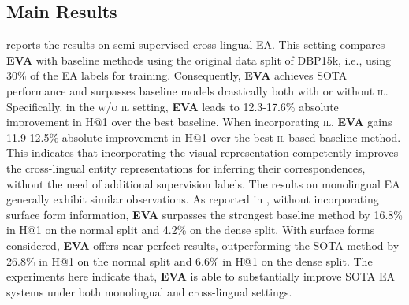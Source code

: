 \documentclass[letterpaper]{article} \usepackage{aaai21}  \usepackage{times}  \usepackage{helvet} \usepackage{courier}  \usepackage[hyphens]{url}  \usepackage{graphicx} \urlstyle{rm} \def\UrlFont{\rm}  \usepackage{natbib}  \usepackage{caption} \frenchspacing  \setlength{\pdfpagewidth}{8.5in}  \setlength{\pdfpageheight}{11in}
\newcommand{\modelname}[0]{\textbf{\textsc{EVA}}\xspace}
\newcommand{\stitle}[1]{\vspace{0.3ex} \noindent{\bf #1}}
\begin{document}
\subsection{Main Results}\label{sec:main_results}

\stitle{Semi-supervised EA.}
\label{sec:exp_semi}
 reports the results on semi-supervised cross-lingual EA. 
This setting compares \modelname 
with baseline methods using the original data split of DBP15k, i.e., using 30\% of the EA labels for training.
Consequently, \modelname achieves SOTA performance and surpasses baseline models drastically both with or without \textsc{il}. Specifically, in the \textsc{w/o il} setting, \modelname leads to 12.3-17.6\% absolute improvement in H@1 over the best baseline.
When incorporating \textsc{il}, \modelname gains 11.9-12.5\% absolute improvement in H@1 over the best \textsc{il}-based baseline method.
This indicates that incorporating the visual representation competently improves the cross-lingual entity representations for inferring their correspondences, without the need of additional supervision labels.
The results on monolingual EA generally exhibit similar observations.
As reported in ,
without incorporating surface form information, \modelname surpasses the strongest baseline method by 16.8\% in H@1 on the normal split and 4.2\% on the dense split. 
With surface forms considered, \modelname offers near-perfect results, outperforming the SOTA method by 26.8\% in H@1 on the normal split and 6.6\% in H@1 on the dense split. 
The experiments here indicate that, \modelname is able to substantially improve SOTA EA systems under both monolingual and cross-lingual settings.
\end{document}
